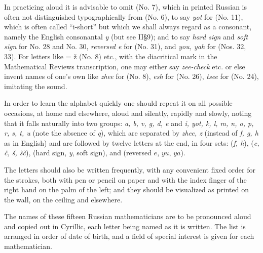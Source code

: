 In practicing aloud it is advisable to omit  (No. 7), which in printed Russian is often not distinguished typographically from  (No. 6), to say \emph{yot} for  (No. 11), which is often called ``i-short'' but which we shall always regard as a consonant, namely the English consonantal \emph{y} (but see II§9); and to say \emph{hard sign} and \emph{soft sign} for No. 28 and No. 30, \emph{reversed e} for  (No. 31), and \emph{you, yah} for  (Nos. 32, 33). For letters like  = ž (No. 8) etc., with the diacritical mark in the Mathematical Reviews transcription, one may either say \emph{zee-check} etc. or else invent names of one's own like \emph{zhee} for  (No. 8), \emph{esh} for  (No. 26), \emph{tsee} for  (No. 24), imitating the sound.

In order to learn the alphabet quickly one should repeat it on all possible occasions, at home and elsewhere, aloud and silently, rapidly and slowly, noting that it falls naturally into two groups: \emph{a, b, v, g, d, e} and \emph{i, yot, k, l, m, n, o, p, r, s, t, u} (note the absence of \emph{q}), which are separated by \emph{zhee, z} (instead of \emph{f, g, h} as in English) and are followed by twelve letters at the end, in four sets: (\emph{f, h}), (\emph{c, č, š, šč}), (hard sign, \emph{y}, soft sign), and (reversed $e$, $yu$, $ya$).

The letters should also be written frequently, with any convenient fixed order for the strokes, both with pen or pencil on paper and with the index finger of the right hand on the palm of the left; and they should be visualized as printed on the wall, on the ceiling and elsewhere.

\begin{keybox}[Exercise 1.1]
The names of these fifteen Russian mathematicians are to be pronounced aloud and copied out in Cyrillic, each letter being named as it is written. The list is arranged in order of date of birth, and a field of special interest is given for each mathematician.
\end{keybox}

